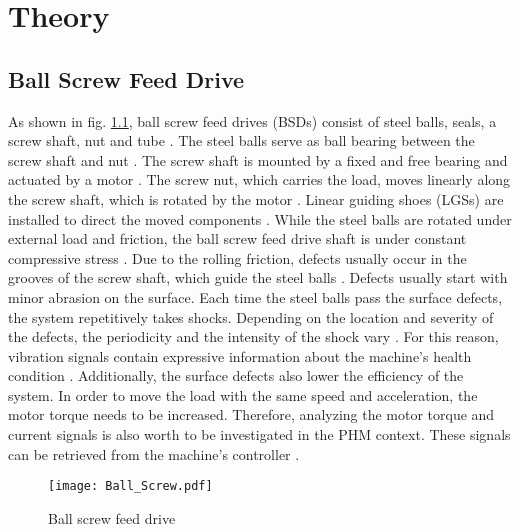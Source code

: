 \chapter{Theory}\label{chapter:theory}

\section{Ball Screw Feed Drive}
As shown in fig. \ref{fig:Ball_Screw}, ball screw feed drives (BSDs) consist of steel balls, seals, a screw shaft, nut and tube \cite{Lee2015}. The steel balls serve as ball bearing between the screw shaft and nut \cite{Lee2015}. The screw shaft is mounted by a fixed and free bearing and actuated by a motor \cite{DENG2020}. The screw nut, which carries the load, moves linearly along the screw shaft, which is rotated by the motor \cite{Lee2015}. Linear guiding shoes (LGSs) are installed to direct the moved components \cite{DENG2020}. While the steel balls are rotated under external load and friction, the ball screw feed drive shaft is under constant compressive stress \cite{Lee2015}. Due to the rolling friction, defects usually occur in the grooves of the screw shaft, which guide the steel balls \cite{Lee2015}. Defects usually start with minor abrasion on the surface. Each time the steel balls pass the surface defects, the system repetitively takes shocks. Depending on the location and severity of the defects, the periodicity and the intensity of the shock vary \cite{Lee2015}. For this reason, vibration signals contain expressive information about the machine's health condition \cite{Lee2015}. Additionally, the surface defects also lower the efficiency of the system. In order to move the load with the same speed and acceleration, the motor torque needs to be increased. Therefore, analyzing the motor torque and current signals is also worth to be investigated in the PHM context. These signals can be retrieved from the machine's controller \cite{AZAMFAR2020103932}.

\begin{figure}[H]
  \centering
  \texttt{[image: Ball\_Screw.pdf]}
  \caption {Ball screw feed drive \cite{DENG2020}} \label{fig:Ball_Screw}
\end{figure}

